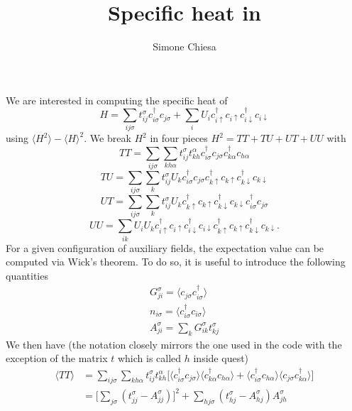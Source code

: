 \documentclass{revtex4}
\begin{document}
\title{Specific heat in }

\author{Simone Chiesa}%

\maketitle

We are interested in computing the specific heat of 
\begin{equation}
H=\sum_{ij\sigma} t_{ij}^\sigma c_{i\sigma}^\dagger c_{j\sigma}
+\sum_i U_i c^\dagger_{i\uparrow} c_{i\uparrow} c^\dagger_{i\downarrow} c_{i\downarrow}
\end{equation}
using $\langle H^2 \rangle - \langle H\rangle^2$. We break 
$ H^2 $ in four pieces $H^2 = TT + TU + UT + UU$ with
\begin{equation}
TT = \sum_{ij\sigma}\sum_{kh\alpha}  t_{ij}^\sigma t_{kh}^\alpha c_{i\sigma}^\dagger c_{j\sigma} c_{k\alpha}^\dagger c_{h\alpha}
\end{equation}
\begin{equation}
TU = \sum_{ij\sigma}\sum_{k}  t_{ij}^\sigma U_{k} c_{i\sigma}^\dagger c_{j\sigma} c^\dagger_{k\uparrow} c_{k\uparrow} c^\dagger_{k\downarrow} c_{k\downarrow}
\end{equation}
\begin{equation}
UT = \sum_{ij\sigma}\sum_{k}  t_{ij}^\sigma U_{k} c^\dagger_{k\uparrow} c_{k\uparrow} c^\dagger_{k\downarrow} c_{k\downarrow}  c_{i\sigma}^\dagger c_{j\sigma}
\end{equation}
\begin{equation}
UU = \sum_{ik} U_i U_k c^\dagger_{i\uparrow} c_{i\uparrow} c^\dagger_{i\downarrow} c_{i\downarrow} c^\dagger_{k\uparrow} c_{k\uparrow} c^\dagger_{k\downarrow} c_{k\downarrow}.
\end{equation}
For a given configuration of auxiliary fields, the expectation value can be computed via Wick's theorem.
To do so, it is useful to introduce the following quantities
\begin{eqnarray}
G_{ji}^\sigma  = \langle c_{j\sigma} c^\dagger_{i\sigma} \rangle \\
n_{i\sigma}  = \langle c^\dagger_{i\sigma} c_{i\sigma} \rangle \\
A_{ji}^\sigma  = \sum_k G_{ik}^\sigma t_{kj}^\sigma 
\end{eqnarray}
We then have (the notation closely mirrors the one used in the code with the exception of the matrix
$t$ which is called $h$ inside {\sc quest})
\begin{equation}
\begin{split}
\langle TT \rangle 
&=\sum_{ij\sigma}\sum_{kh\alpha}  t_{ij}^\sigma t_{kh}^\alpha \Big[
\langle c_{i\sigma}^\dagger c_{j\sigma}\rangle\langle c_{k\alpha}^\dagger c_{h\alpha} \rangle +
\langle c_{i\sigma}^\dagger c_{h\alpha}\rangle \langle c_{j\sigma} c_{k\alpha}^\dagger  \rangle \Big]
\\
&=\Big[\sum_{j\sigma} (t_{jj}^\sigma - A_{jj}^\sigma)\Big]^2 +
\sum_{hj\sigma} (t_{hj}^\sigma - A_{hj}^\sigma) A_{jh}^\sigma \\
\end{split}
\end{equation}
\end{document}
